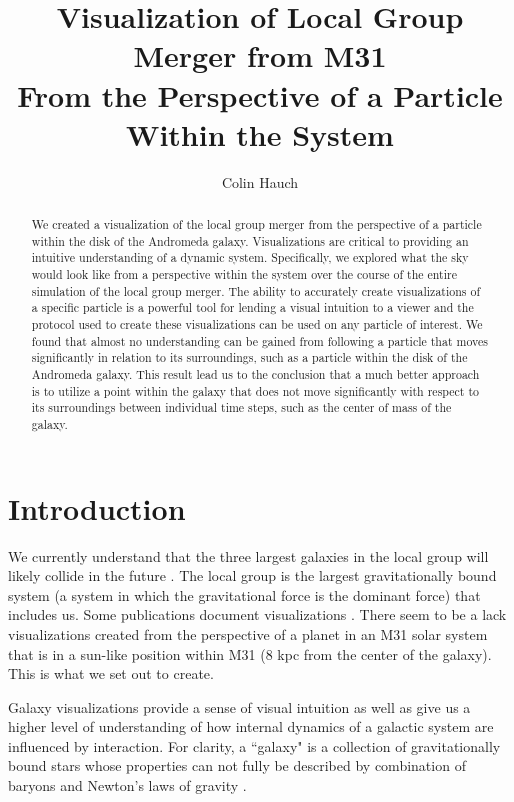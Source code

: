 \documentclass[twocolumn]{aastex63}
\begin{document}
\title{Visualization of Local Group Merger from M31\\From the Perspective of a Particle Within the System}
\author{Colin Hauch}


\begin{abstract}
    We created a visualization of the local group merger from the perspective of a particle within the disk of the Andromeda galaxy. Visualizations are critical to providing an intuitive understanding of a dynamic system. Specifically, we explored what the sky would look like from a perspective within the system over the course of the entire simulation of the local group merger. The ability to accurately create visualizations of a specific particle is a powerful tool for lending a visual intuition to a viewer and the protocol used to create these visualizations can be used on any particle of interest. We found that almost no understanding can be gained from following a particle that moves significantly in relation to its surroundings, such as a particle within the disk of the Andromeda galaxy. This result lead us to the conclusion that a much better approach is to utilize a point within the galaxy that does not move significantly with respect to its surroundings between individual time steps, such as the center of mass of the galaxy.
\end{abstract}{}

\section{Introduction} \label{sec:intro}

We currently understand that the three largest galaxies in the local group will likely collide in the future \citep[e.g.]{vdm12,vdm19}. The local group is the largest gravitationally bound system (a system in which the gravitational force is the dominant force) that includes us.
Some publications document visualizations \citep{cox08}. There seem to be a lack visualizations created from the perspective of a planet in an M31 solar system that is in a sun-like position within M31 (8 kpc from the center of the galaxy). This is what we set out to create.

Galaxy visualizations provide a sense of visual intuition as well as give us a higher level of understanding of how internal dynamics of a galactic system are influenced by interaction. For clarity, a ``galaxy" is a collection of gravitationally bound stars whose properties can not fully be described by combination of baryons and Newton's laws of gravity \citep{will12}. 
\end{document}
